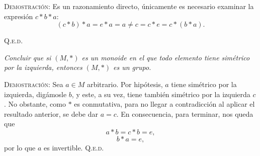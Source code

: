 \documentclass{article}
\begin{document}
\begin{enumerate}
    \vspace{7px}

    \textsc{Demostración}: Es un razonamiento directo, únicamente es necesario examinar la expresión $c * b * a$: \[(c * b) * a = e * a = a \neq c = c * e = c * (b * a).\]

    \hfill{\textsc{Q.e.d.}}

    \vspace{7px}

    \newpage

    \textit{Concluir que si $(M, *)$ es un monoide en el que todo elemento tiene simétrico por la izquierda, entonces $(M, *)$ es un grupo.}

    \vspace{7px}

    \textsc{Demostración}: Sea $a \in M$ arbitrario. Por hipótesis, $a$ tiene simétrico por la izquierda, digámosle $b$, y este, a su vez, tiene también simétrico por la izquierda $c$. No obstante, como $*$ es conmutativa, para no llegar a contradicción al aplicar el resultado anterior, se debe dar $a = c$. En consecuencia, para terminar, nos queda que \[a * b = c * b = e,\] \[b * a = e,\] por lo que $a$ es invertible. \hfill{\textsc{Q.e.d.}}
\end{enumerate}
\end{document}
